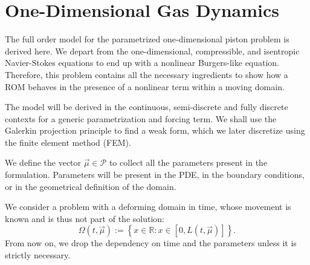 \documentclass[../../thesis.tex]{subfiles}
\begin{document}
\section{One-Dimensional Gas Dynamics}
\label{sec:fom_definition}
The full order model for the parametrized one-dimensional 
piston problem is derived here.
We depart from the one-dimensional, compressible, and isentropic \mbox{Navier-Stokes} equations 
to end up with a nonlinear Burgers-like equation.
Therefore, this problem contains all the necessary ingredients to show how a ROM behaves 
in the presence of a nonlinear term within a moving domain.

The model will be derived in the continuous, semi-discrete and fully discrete contexts 
for a generic parametrization and forcing term.
We shall use the Galerkin projection principle to find a weak form, 
which we later discretize using the finite element method (FEM). 

We define the vector $\vec{\mu} \in \mathcal{P}$ to collect 
all the parameters present in the formulation.
Parameters will be present in the PDE, in the boundary conditions, 
or in the geometrical definition of the domain. 

We consider a problem with a deforming domain in time, whose movement is known and 
is thus not part of the solution:
\begin{equation*}
    \Omega(t, \vec{\mu}) := \left\{x \in \mathbb{R} : x \in \left[0, L(t, \vec{\mu})\right]\right\}.
\end{equation*}
From now on, we drop the dependency on time and the parameters unless it is strictly necessary.
\end{document}
